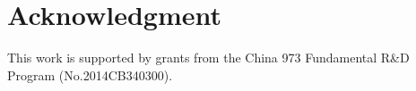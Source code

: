 \section{Acknowledgment}
This work is supported by grants from
the China 973 Fundamental R\&D Program (No.2014CB340300).
